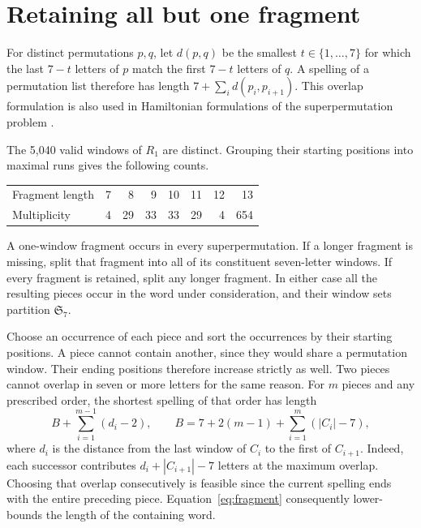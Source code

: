 \documentclass[11pt]{article}
\newcommand{\Sym}{\mathfrak S_7}
\begin{document}
\section{Retaining all but one fragment}
For distinct permutations $p,q$, let $d(p,q)$ be the smallest $t\in\{1,\ldots,7\}$ for which the last $7-t$ letters of $p$ match the first $7-t$ letters of $q$. A spelling of a permutation list therefore has length $7+\sum_i d(p_i,p_{i+1})$. This overlap formulation is also used in Hamiltonian formulations of the superpermutation problem \cite{houston}.

The 5,040 valid windows of $R_1$ are distinct. Grouping their starting positions into maximal runs gives the following counts.
\begin{center}
\begin{tabular}{lrrrrrrr}
\toprule
Fragment length &7&8&9&10&11&12&13\\
Multiplicity &4&29&33&33&29&4&654\\
\bottomrule
\end{tabular}
\end{center}
A one-window fragment occurs in every superpermutation. If a longer fragment is missing, split that fragment into all of its constituent seven-letter windows. If every fragment is retained, split any longer fragment. In either case all the resulting pieces occur in the word under consideration, and their window sets partition $\Sym$.

Choose an occurrence of each piece and sort the occurrences by their starting positions. A piece cannot contain another, since they would share a permutation window. Their ending positions therefore increase strictly as well. Two pieces cannot overlap in seven or more letters for the same reason. For $m$ pieces and any prescribed order, the shortest spelling of that order has length
\begin{equation}
 B+\sum_{i=1}^{m-1}(d_i-2),\qquad
 B=7+2(m-1)+\sum_{i=1}^m (|C_i|-7),\label{eq:fragment}
\end{equation}
where $d_i$ is the distance from the last window of $C_i$ to the first of $C_{i+1}$. Indeed, each successor contributes $d_i+|C_{i+1}|-7$ letters at the maximum overlap. Choosing that overlap consecutively is feasible since the current spelling ends with the entire preceding piece. Equation~\eqref{eq:fragment} consequently lower-bounds the length of the containing word.
\end{document}
